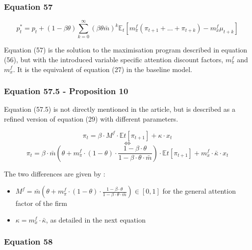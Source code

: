 \documentclass{article}
\begin{document}
\subsubsection*{Equation 57}

\begin{equation}\tag{57}
    p^{*}_{t}=p_{t}+(1-\beta\theta)\sum^{\infty}_{k=0} \left(\beta\theta\bar{m}\right)^{k}\mathbb{E}_{t}\left[m^{f}_{\pi}(\pi_{t+1}+...+\pi_{t+k})-m^{f}_{x}\mu_{t+k}\right]
\end{equation}

Equation (57) is the solution to the maximisation program described in equation (56), but with the introduced variable specific attention discount factors, $m^{f}_{\pi}$ and $m^{f}_{x}$.
It is the equivalent of equation (27) in the baseline model. 

\subsubsection*{Equation 57.5 - Proposition 10}

Equation (57.5) is not directly mentioned in the article, but is described as a refined version of equation (29) with different parameters.

\begin{equation}\tag{57.5}
    \pi_{t}=\beta\cdot M^{f}\cdot\mathbb{E}t\left[\pi_{t+1}\right]+\kappa\cdot x_{t}
\end{equation}
$$\iff$$
\begin{equation}\tag{57.5}
    \pi_{t}=\beta\cdot\bar{m}\left(\theta+m^{f}_{\pi}\cdot(1-\theta)\cdot\frac{1-\beta\cdot\theta}{1-\beta\cdot\theta\cdot\bar{m}}\right)\cdot\mathbb{E}t\left[\pi_{t+1}\right]+m_{x}^{f}\cdot\bar{\kappa}\cdot x_{t}
\end{equation}

The two differences are given by : 
\begin{itemize}
    \item $M^{f}=\bar{m}\left(\theta+m^{f}_{\pi}\cdot(1-\theta)\cdot\frac{1-\beta\cdot\theta}{1-\beta\cdot\theta\cdot\bar{m}}\right)\in\left[0,1\right]$ for the general attention factor of the firm
    \item $\kappa=m_{x}^{f}\cdot\bar{\kappa}$, as detailed in the next equation
\end{itemize}

\subsubsection*{Equation 58}
\end{document}
